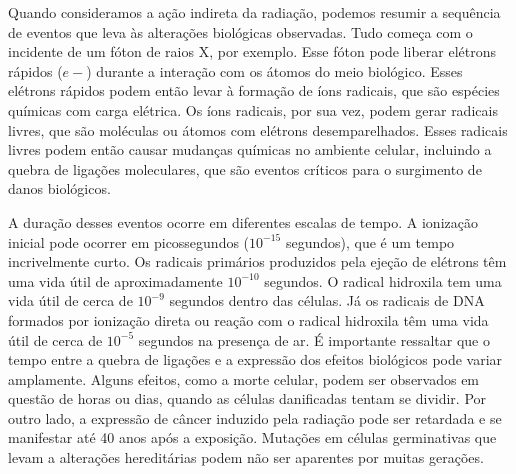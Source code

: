 \documentclass[11pt,a4paper]{article}
\newcounter{exemplo}
\begin{document}
    Quando consideramos a ação indireta da radiação, podemos resumir a sequência de eventos que leva às alterações biológicas observadas. Tudo começa com o incidente de um fóton de raios X, por exemplo. Esse fóton pode liberar elétrons rápidos ($e-$) durante a interação com os átomos do meio biológico. Esses elétrons rápidos podem então levar à formação de íons radicais, que são espécies químicas com carga elétrica. Os íons radicais, por sua vez, podem gerar radicais livres, que são moléculas ou átomos com elétrons desemparelhados. Esses radicais livres podem então causar mudanças químicas no ambiente celular, incluindo a quebra de ligações moleculares, que são eventos críticos para o surgimento de danos biológicos.

    A duração desses eventos ocorre em diferentes escalas de tempo. A ionização inicial pode ocorrer em picossegundos ($10^{-15}$ segundos), que é um tempo incrivelmente curto. Os radicais primários produzidos pela ejeção de elétrons têm uma vida útil de aproximadamente $10^{-10}$ segundos. O radical hidroxila  tem uma vida útil de cerca de $10^{-9}$ segundos dentro das células. Já os radicais de DNA formados por ionização direta ou reação com o radical hidroxila têm uma vida útil de cerca de $10^{-5}$ segundos na presença de ar. É importante ressaltar que o tempo entre a quebra de ligações e a expressão dos efeitos biológicos pode variar amplamente. Alguns efeitos, como a morte celular, podem ser observados em questão de horas ou dias, quando as células danificadas tentam se dividir. Por outro lado, a expressão de câncer induzido pela radiação pode ser retardada e se manifestar até 40 anos após a exposição. Mutações em células germinativas que levam a alterações hereditárias podem não ser aparentes por muitas gerações.



\end{document}
